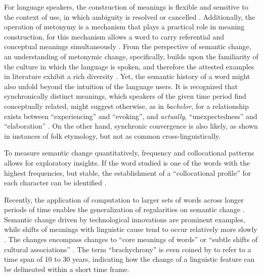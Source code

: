 For language speakers, the construction of meanings is flexible and sensitive to the context of use, in which ambiguity is resolved or cancelled \parencite{miller1991contextual,harris1954distributional}. Additionally, the operation of metonymy is a mechanism that plays a practical role in meaning construction, for this mechanism allows a word to carry referential and conceptual meanings simultaneously \parencite{hilpert2019historical,nerlich2001serial}. From the perspective of semantic change, an understanding of metonymic change, specifically, builds upon the familiarity of the culture in which the language is spoken, and therefore the attested examples in literature exhibit a rich diversity \parencite[649]{fortson2017approach}. Yet, the semantic history of a word might also unfold beyond the intuition of the language users.  It is recognized that synchronically distinct meanings, which speakers of the given time period find conceptually related, might suggest otherwise, as in \textit{bachelor}, for a relationship exists between ``experiencing'' and ``evoking'', and \textit{actually}, ``unexpectedness'' and ``elaboration'' \parencite[13]{traugott2001regularity}. On the other hand, synchronic convergence is also likely, as shown in instances of folk etymology, but not as common cross­-linguistically.

To measure semantic change quantitatively, frequency and collocational patterns allows for exploratory insights. If the word studied is one of the words with the highest frequencies, but stable, the establishment of a ``collocational profile'' for each character can be identified \parencite{firth1957modes}.

Recently, the application of computation to larger sets of words across longer periods of time enables the generalization of regularities on semantic change \parencite{hamilton2016law}. Semantic change driven by technological innovations are prominent examples, while shifts of meanings with linguistic cause tend to occur relatively more slowly \parencite{hamilton2016law}. The changes encompass changes to ``core meanings of words'' or ``subtle shifts of cultural associations'' \parencite{hamilton2016cultural}. The term ``brachychrony'' is even coined by \textcite{mair1998corpora} \textcite{renouf2002time} to refer to a time span of 10 to 30 years, indicating how the change of a linguistic feature can be delineated within a short time frame.

